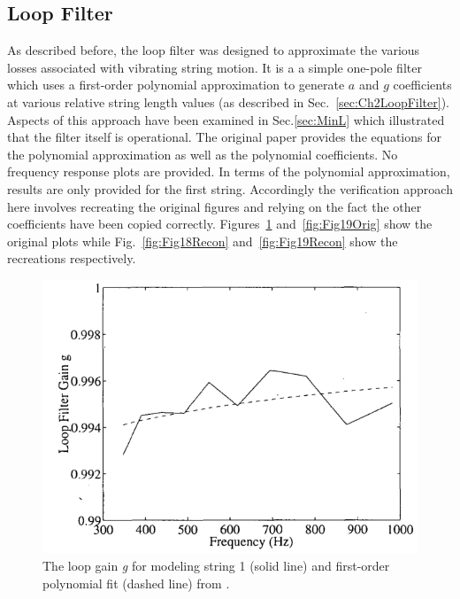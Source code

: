 \documentclass[../main.tex]{subfiles}
\begin{document}
\subsection{Loop Filter}
As described before, the loop filter was designed to approximate the various losses associated with vibrating string motion. It is a a simple one-pole filter which uses a first-order polynomial approximation to generate $a$ and $g$ coefficients at various relative string length values (as described in Sec.~\ref{sec:Ch2LoopFilter}). Aspects of this approach have been examined in Sec.\ref{sec:MinL} which illustrated that the filter itself is operational. The original paper provides the equations for the polynomial approximation as well as the polynomial coefficients. No frequency response plots are provided. In terms of the polynomial approximation, results are only provided for the first string. Accordingly the verification approach here involves recreating the original figures and relying on the fact the other coefficients have been copied correctly. Figures~\ref{fig:Fig18Orig} and~\ref{fig:Fig19Orig} show the original plots while Fig.~\ref{fig:Fig18Recon} and~\ref{fig:Fig19Recon} show the recreations respectively.

\begin{figure}[h]
    \centering
    \includegraphics[scale=.75]{./images/plots/Figure18Orig.png}
    \caption{The loop gain \emph{g} for modeling string 1 (solid line) and first-order polynomial fit (dashed line) from .}
    \label{fig:Fig18Orig}
\end{figure}
\end{document}
